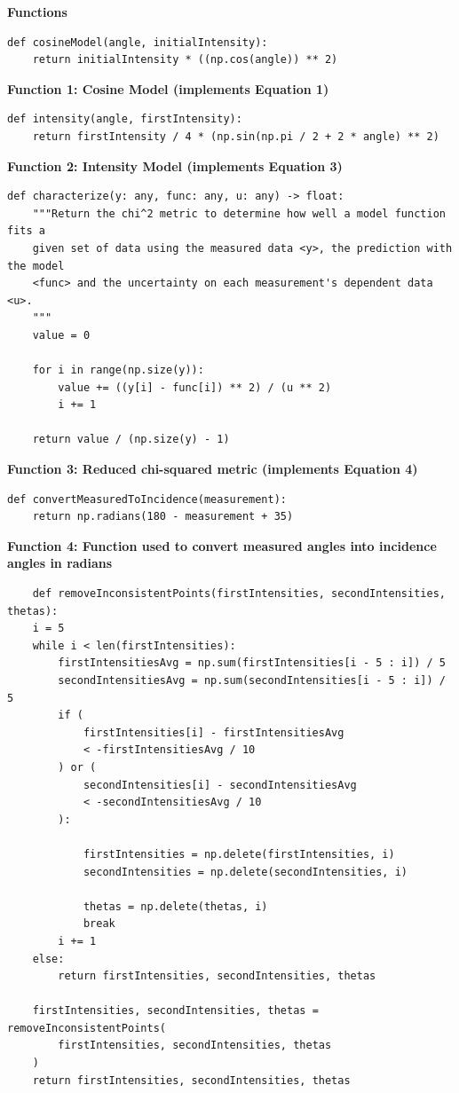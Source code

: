 \documentclass[
	letterpaper, %
	10pt, %
]{CSUniSchoolLabReport}
\begin{document}
\newpage
{\large\textbf{Functions}}\\
\begin{verbatim}
def cosineModel(angle, initialIntensity):
    return initialIntensity * ((np.cos(angle)) ** 2)
\end{verbatim}
\begin{center}
	\textbf{Function 1: Cosine Model (implements Equation 1)}\\
\end{center}
\begin{verbatim}
def intensity(angle, firstIntensity):
    return firstIntensity / 4 * (np.sin(np.pi / 2 + 2 * angle) ** 2)
\end{verbatim}
\begin{center}
	\textbf{Function 2: Intensity Model (implements Equation 3)}\\
\end{center}
\begin{verbatim}
def characterize(y: any, func: any, u: any) -> float:
    """Return the chi^2 metric to determine how well a model function fits a
    given set of data using the measured data <y>, the prediction with the model
    <func> and the uncertainty on each measurement's dependent data <u>.
    """
    value = 0

    for i in range(np.size(y)):
        value += ((y[i] - func[i]) ** 2) / (u ** 2)
        i += 1

    return value / (np.size(y) - 1)
\end{verbatim}
\begin{center}
	\textbf{Function 3: Reduced chi-squared metric (implements Equation 4)}
\end{center}
\begin{verbatim}
def convertMeasuredToIncidence(measurement):
    return np.radians(180 - measurement + 35)
\end{verbatim}
\begin{center}
	\textbf{Function 4: Function used to convert measured angles into incidence angles in radians}
\end{center}
\newpage
\begin{verbatim}
	def removeInconsistentPoints(firstIntensities, secondIntensities, thetas):
    i = 5
    while i < len(firstIntensities):
        firstIntensitiesAvg = np.sum(firstIntensities[i - 5 : i]) / 5
        secondIntensitiesAvg = np.sum(secondIntensities[i - 5 : i]) / 5
        if (
            firstIntensities[i] - firstIntensitiesAvg
            < -firstIntensitiesAvg / 10
        ) or (
            secondIntensities[i] - secondIntensitiesAvg
            < -secondIntensitiesAvg / 10
        ):

            firstIntensities = np.delete(firstIntensities, i)
            secondIntensities = np.delete(secondIntensities, i)

            thetas = np.delete(thetas, i)
            break
        i += 1
    else:
        return firstIntensities, secondIntensities, thetas

    firstIntensities, secondIntensities, thetas = removeInconsistentPoints(
        firstIntensities, secondIntensities, thetas
    )
    return firstIntensities, secondIntensities, thetas


\end{verbatim}
\end{document}
